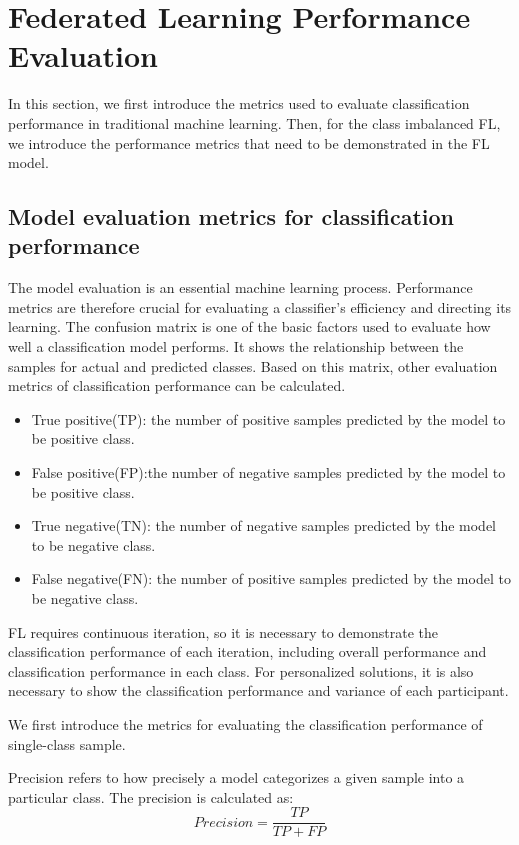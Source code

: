\documentclass[10pt,journal,compsoc]{IEEEtran}
\begin{document}
	\section{Federated Learning Performance Evaluation}
	In this section, we first introduce the metrics used to evaluate classification performance in traditional machine learning. Then, for the class imbalanced FL, we introduce the performance metrics that need to be demonstrated in the FL model. 
	\subsection{Model evaluation metrics for classification performance}
	The model evaluation is an essential machine learning process. Performance metrics are therefore crucial for evaluating a classifier's efficiency and directing its learning. The confusion matrix is one of the basic factors used to evaluate how well a classification model performs. It shows the relationship between the samples for actual and predicted classes. Based on this matrix, other evaluation metrics of classification performance can be calculated.
	
	\begin{itemize} 
		\item True positive(TP): the number of positive samples predicted by the model to be positive class.
		\item False positive(FP):the number of negative samples predicted by the model to be positive class.
		\item True negative(TN): the number of negative samples predicted by the model to be negative class.
		\item False negative(FN): the number of positive samples predicted by the model to be negative class.
	\end{itemize}
	
	FL requires continuous iteration, so it is necessary to demonstrate the classification performance of each iteration, including overall performance and classification performance in each class. For personalized solutions, it is also necessary to show the classification performance and variance of each participant.
	
	We first introduce the metrics for evaluating the classification performance of single-class sample.
	
	Precision refers to how precisely a model categorizes a given sample into a particular class. The precision is calculated as:
	\begin{equation}
	Precision=\frac{TP}{TP + FP}
	\end{equation}
	
\end{document}
